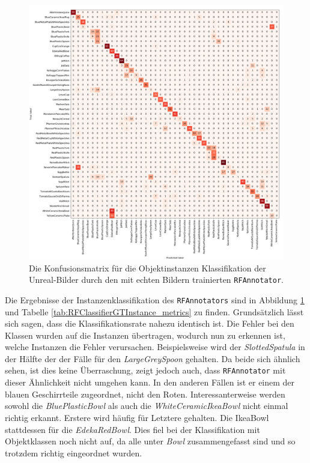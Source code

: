 \begin{figure}
\centering
	\includegraphics[scale=.292]{img/chapter6/RFClassifierGTInstance.png}
\caption[Konfusionsmatrix der Klassifizierung der Objektinstanzen durch den RFAnnotator]{Die Konfusionsmatrix für die Objektinstanzen Klassifikation der Unreal-Bilder durch den mit echten Bildern trainierten \texttt{RFAnnotator}.}
\label{fig:RFClassifierGTInstance_confMatrix}
\end{figure}

Die Ergebnisse der Instanzenklassifikation des \texttt{RFAnnotators} sind in Abbildung \ref{fig:RFClassifierGTInstance_confMatrix} und Tabelle \ref{tab:RFClassifierGTInstance_metrics} zu finden. Grundsätzlich lässt sich sagen, dass die Klassifikationsrate nahezu identisch ist. Die Fehler bei den Klassen wurden auf die Instanzen übertragen, wodurch nun zu erkennen ist, welche Instanzen die Fehler verursachen. Beispielsweise wird der \textit{SlottedSpatula} in der Hälfte der der Fälle für den \textit{LargeGreySpoon} gehalten. Da beide sich ähnlich sehen, ist dies keine Überraschung, zeigt jedoch auch, dass \texttt{RFAnnotator} mit dieser Ähnlichkeit nicht umgehen kann. In den anderen Fällen ist er einem der blauen Geschirrteile zugeordnet, nicht den Roten. \newline
Interessanterweise werden sowohl die \textit{BluePlasticBowl} als auch die \textit{WhiteCeramicIkeaBowl} nicht einmal richtig erkannt. Erstere wird häufig für Letztere gehalten. Die IkeaBowl stattdessen für die \textit{EdekaRedBowl}. Dies fiel bei der Klassifikation mit Objektklassen noch nicht auf, da alle unter \textit{Bowl} zusammengefasst sind und so trotzdem richtig eingeordnet wurden.   


